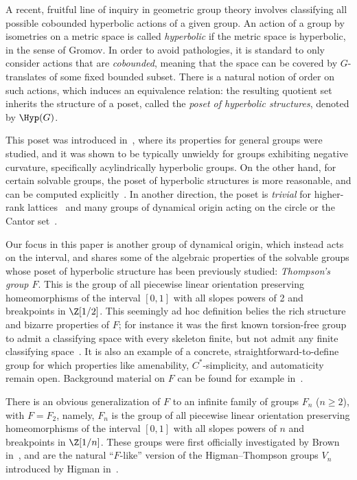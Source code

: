 A recent, fruitful line of inquiry in geometric group theory involves classifying all possible cobounded hyperbolic actions of a given group. An action of a group by isometries on a metric space is called \emph{hyperbolic} if the metric space is hyperbolic, in the sense of Gromov. In order to avoid pathologies, it is standard to only consider actions that are \emph{cobounded}, meaning that the space can be covered by $G$-translates of some fixed bounded subset. There is a natural notion of order on such actions, which induces an equivalence relation: the resulting quotient set inherits the structure of a poset, called the \emph{poset of hyperbolic structures}, denoted by $\Hyp(G)$.

This poset was introduced in~\cite{ABO}, where its properties for general groups were studied, and it was shown to be typically unwieldy for groups exhibiting negative curvature, specifically acylindrically hyperbolic groups. On the other hand, for certain solvable groups, the poset of hyperbolic structures is more reasonable, and can be computed explicitly~\cite{caprace15, sahana:wreath, AR:BS, confining, ABR2}. In another direction, the poset is \emph{trivial} for higher-rank lattices~\cite{haettel} and many groups of dynamical origin acting on the circle or the Cantor set~\cite{anthony, NL}.

Our focus in this paper is another group of dynamical origin, which instead acts on the interval, and shares some of the algebraic properties of the solvable groups whose poset of hyperbolic structure has been previously studied: \emph{Thompson's group $F$}.
This is the group of all piecewise linear orientation preserving homeomorphisms of the interval $[0,1]$ with all slopes powers of 2 and breakpoints in $\Z[1/2]$. This seemingly ad hoc definition belies the rich structure and bizarre properties of $F$; for instance it was the first known torsion-free group to admit a classifying space with every skeleton finite, but not admit any finite classifying space~\cite{brown84}. It is also an example of a concrete, straightforward-to-define group for which properties like amenability, $C^*$-simplicity, and automaticity remain open. Background material on $F$ can be found for example in~\cite{belk04,cannon96}.

There is an obvious generalization of $F$ to an infinite family of groups $F_n$ ($n\ge 2$), with $F=F_2$, namely, $F_n$ is the group of all piecewise linear orientation preserving homeomorphisms of the interval $[0,1]$ with all slopes powers of $n$ and breakpoints in $\Z[1/n]$. These groups were first officially investigated by Brown in~\cite{brown87}, and are the natural ``$F$-like'' version of the Higman--Thompson groups $V_n$ introduced by Higman in~\cite{higman74}.

